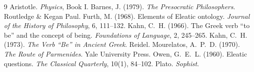\documentclass{situationist-preprint}
\begin{document}
\begin{thebibliography}{9}\small
{} Aristotle. \emph{Physics}, Book I.
 Barnes, J. (1979). \emph{The Presocratic Philosophers}. Routledge \& Kegan Paul.
 Furth, M. (1968). Elements of Eleatic ontology. \emph{Journal of the History of Philosophy}, 6, 111--132.
 Kahn, C.~H. (1966). The Greek verb \enquote{to be} and the concept of being. \emph{Foundations of Language}, 2, 245--265.
 Kahn, C.~H. (1973). \emph{The Verb \enquote{Be} in Ancient Greek}. Reidel.
 Mourelatos, A.~P.~D. (1970). \emph{The Route of Parmenides}. Yale University Press.
 Owen, G.~E.~L. (1960). Eleatic questions. \emph{The Classical Quarterly}, 10(1), 84--102.
 Plato. \emph{Sophist}.
\end{thebibliography}
\end{document}
